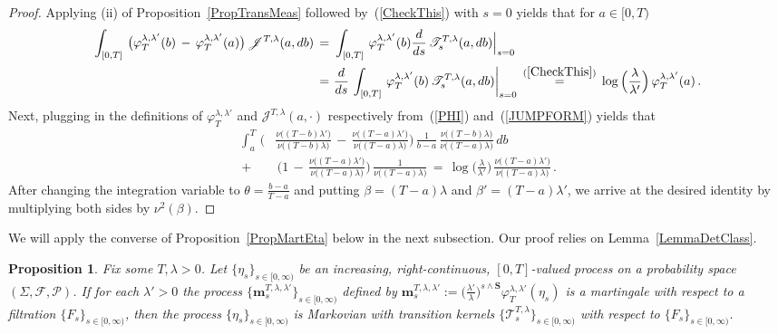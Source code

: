 \documentclass[10pt]{article}
\def\stackrel#1#2{\mathrel{\mathop{#2}\limits^{#1}}}
\numberwithin{equation}{section}
\newtheorem{proposition}[theorem]{Proposition}
\theoremstyle{definition}
\begin{document}
\begin{proof}  Applying (ii) of Proposition~\ref{PropTransMeas} followed by~(\ref{CheckThis}) with $s=0$ yields that for $a\in [0,T)$
\begin{align*}
 \int_{[0,T]}\, \big( \varphi_T^{\lambda,\lambda'}(b)\,-\, \varphi_T^{\lambda,\lambda'}(a)  \big)\,  \mathscr{J}^{T,\lambda }(a,db)\,=\, &\,
\int_{[0,T]} \, \varphi_T^{\lambda,\lambda'}(b)\frac{d}{ds} \,\mathscr{T}^{T,\lambda}_{s}(a,db) \Big|_{s=0}\nonumber \\ \,=\, &\,\frac{d}{ds} \,\int_{[0,T]} \, \varphi_T^{\lambda,\lambda'}(b)\,\mathscr{T}^{T,\lambda}_{s}(a,db)  \bigg|_{s=0} \,\stackrel{(\ref{CheckThis})}{=}\,  \log\Big(\frac{\lambda}{\lambda'}\Big) \,\varphi_T^{\lambda,\lambda'}(a)\,. 
\end{align*}
Next, plugging in the definitions of  $\varphi_T^{\lambda,\lambda'}$ and $ \mathscr{J}^{T,\lambda }(a,\cdot)$ respectively from~(\ref{PHI}) and~(\ref{JUMPFORM}) yields that
\begin{align*}
 \int_{a}^T \,\Bigg( &\frac{ \nu\big((T-b) \lambda' \big)    }{  \nu\big((T-b)\lambda \big)    } \,-\,\frac{ \nu\big((T-a)\lambda'  \big)    }{  \nu\big( (T-a)  \lambda\big)    }   \Bigg) \, \frac{1}{b-a}\,\frac{  \nu\big((T-b )\lambda \big) }{  \nu\big((T-a)\lambda\big)  }\,db \\   \,+\, &\,\Bigg( 1 \,-\,\frac{ \nu\big((T-a)\lambda'  \big)    }{  \nu\big((T-a)\lambda  \big)    }   \Bigg)\,\frac{ 1   }{  \nu\big((T-a)\lambda  \big)    } \,=\, \log\Big(\frac{\lambda}{\lambda'}\Big)\,  \frac{ \nu\big((T-a)\lambda'  \big)    }{  \nu\big((T-a)\lambda  \big)    } \,. 
\end{align*}
After changing the integration variable to $ \theta= \frac{b-a}{T-a}$ and  putting $\beta=(T-a)\lambda $ and $\beta'=(T-a) \lambda' $, we arrive at the desired identity by multiplying both sides by $  \nu^2(\beta) $.
\end{proof}




We will apply the   converse of Proposition~\ref{PropMartEta} below in the next subsection.  Our proof relies on Lemma~\ref{LemmaDetClass}.
\begin{proposition}\label{PropDickmanConv} Fix some $T,\lambda>0$.  Let  $\{ \eta_s \}_{s\in [0,\infty)}$ be an increasing, right-continuous, $[0,T]$-valued process on a probability space  $(\Sigma, \mathcal{F},\mathcal{P})$.    If for each $\lambda'>0$  the process $\{ \mathbf{m}_s^{T,\lambda,\lambda'}\}_{s\in [0,\infty)} $ defined by $ \mathbf{m}_s^{T,\lambda,\lambda'}:= \big(\frac{\lambda'}{\lambda}\big)^{s\wedge \mathbf{S}} \varphi_T^{\lambda,\lambda'}( \eta_s)$  is a martingale
with respect to a filtration  $\{  F_s\}_{s\in [0,\infty)}$, then the process $\{ \eta_s \}_{s\in [0,\infty)}$ is Markovian with transition kernels  $\{ \mathscr{T}^{T,\lambda}_s \}_{s\in [0,\infty)}   $ with respect to $\{  F_s\}_{s\in [0,\infty)}$.
\end{proposition}
\end{document}
